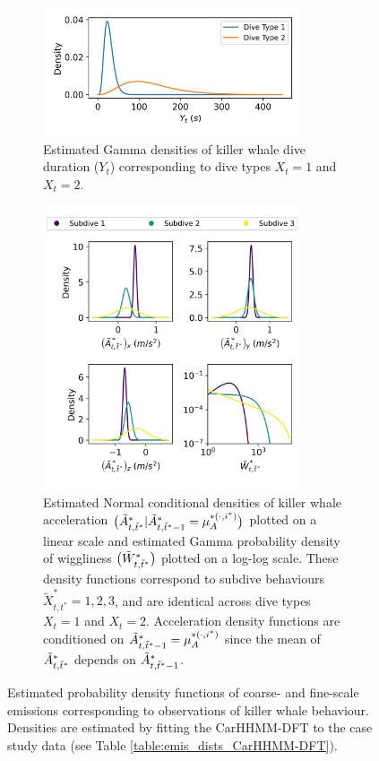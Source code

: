 \begin{figure}[ht]
    \begin{subfigure}{\textwidth}
    	\centering
    	\includegraphics[width=3in]{../Plots/2019/20190902-182840-CATs_OB_1_0_267_CarHHMM2-coarse-emissions.png}
    	\caption{Estimated Gamma densities of killer whale dive duration ($Y_t$) corresponding to dive types $X_t = 1$ and $X_t = 2$.}
    	\label{fig:coarse_emis}
    \end{subfigure}
    \newline
    \begin{subfigure}{\textwidth}
    	\centering
    	\includegraphics[width=3in]{../Plots/2019/20190902-182840-CATs_OB_1_0_267_CarHHMM2-fine-emissions.png}
    	\caption{Estimated Normal conditional densities %
    	of killer whale acceleration $\big(\tilde{A}^*_{t,\tilde t^*}|\tilde{A}^*_{t,\tilde t^*-1} = \mu_A^{*(\cdot,i^*)}\big)$ plotted on a linear scale and estimated Gamma probability density of wiggliness $\big(\tilde{W}^*_{t,\tilde t^*}\big)$ plotted on a log-log scale. These density functions correspond to subdive behaviours $\tilde{X}^*_{t,t^*} = 1,2,3$, and are identical across dive types $X_t = 1$ and $X_t = 2$. Acceleration density functions are conditioned on $\tilde{A}^*_{t,\tilde t^*-1} = \mu_A^{*(\cdot,i^*)}$ since the mean of $\tilde{A}^*_{t,\tilde t^*}$ depends on $\tilde{A}^*_{t,\tilde t^*-1}$.}
    	\label{fig:fine_emis}
    \end{subfigure}
    \caption{Estimated probability density functions of coarse- and fine-scale emissions corresponding to observations of killer whale behaviour. Densities are estimated by fitting the CarHHMM-DFT to the case study data (see Table \ref{table:emis_dists_CarHHMM-DFT}).}
    \label{fig:emis}
\end{figure}

